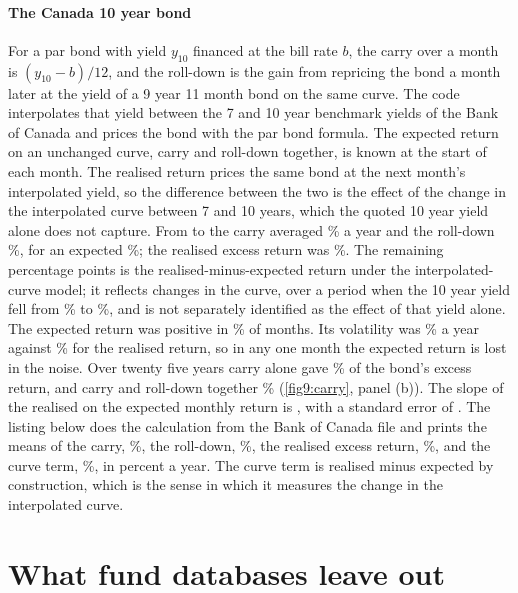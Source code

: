 \begin{chapterrefs}
\paragraph{The Canada 10 year bond}
For a par bond with yield $y_{10}$ financed at the bill rate $b$, the carry over a month is
$(y_{10}-b)/12$, and the roll-down is the gain from repricing the bond a month later at the yield of a 9
year 11 month bond on the same curve. The code interpolates that yield between the 7 and 10 year
benchmark yields of the Bank of Canada and prices the bond with the par bond formula. The expected
return on an unchanged curve, carry and roll-down together, is known at the start of each month. The
realised return prices the same bond at the next month's interpolated yield, so the difference between
the two is the effect of the change in the interpolated curve between 7 and 10 years, which the
quoted 10 year yield alone does not capture. From \gcFirst{} to \gcLast{} the carry averaged
\gcCarry\% a year and the roll-down \gcRoll\%, for an expected \gcExp\%; the realised excess return was
\gcReal\%. The remaining \gcRest{} percentage points is the realised-minus-expected return under the
interpolated-curve model; it reflects changes in the curve, over a period when the 10 year yield fell
from \gcYStart\% to \gcYEnd\%, and is not separately identified as the effect of that yield alone. The expected
return was positive in \gcExpPos\% of months. Its volatility was \gcVolExp\% a year against \gcVolReal\% for
the realised return, so in any one month the expected return is lost in the noise. Over twenty five
years carry alone gave \gcCarryShare\% of the bond's excess return, and carry and roll-down together
\gcExpShare\% (\cref{fig9:carry}, panel (b)). The slope of the realised
on the expected monthly return is \gcSlope, with a standard error of \gcSlopeSe.
The listing below does the calculation from the Bank of Canada file and prints the means of the
carry, \gcCarry\%, the roll-down, \gcRoll\%, the realised excess return, \gcReal\%, and the curve term,
\gcRest\%, in percent a year. The curve term is realised minus expected by construction, which is the
sense in which it measures the change in the interpolated curve.


\FloatBarrier
\section{What fund databases leave out}
\label{sec9:biases}


\end{chapterrefs}
